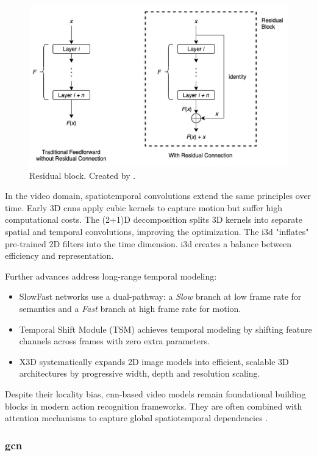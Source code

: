 \begin{figure}
    \centering
    \includegraphics[width=0.5\linewidth]{figures/res_connection.png} 
    \caption{Residual block. Created by \textcite{wong_what_is_residual_2022}.}
    \label{fig:res_connection}
\end{figure}

In the video domain, spatiotemporal convolutions extend the same principles over time. Early 3D \acrshort{cnn}s \cite{tran_learning_2015} apply cubic kernels to capture motion but suffer high computational costs. The (2+1)D decomposition \cite{tran_2_plus_1_convolution} splits 3D kernels into separate spatial and temporal convolutions, improving the optimization. The \acrfull{i3d} \cite{carreira_2017_i3d_quo_vadis} "inflates" pre-trained 2D filters into the time dimension. \acrshort{i3d} creates a balance between efficiency and representation.

Further advances address long-range temporal modeling:
\begin{itemize}
    \item SlowFast networks \cite{feichtenhofer_slowfast_2019} use a dual-pathway: a \emph{Slow} branch at low frame rate for semantics and a \emph{Fast} branch at high frame rate for motion.  
    \item Temporal Shift Module (TSM) \cite{lin_temporal_shift_2019} achieves temporal modeling by shifting feature channels across frames with zero extra parameters.  
    \item X3D \cite{feichtenhofer_x3d_2020} systematically expands 2D image models into efficient, scalable 3D architectures by progressive width, depth and resolution scaling.
\end{itemize}

Despite their locality bias, \acrshort{cnn}-based video models remain foundational building blocks in modern action recognition frameworks. They are often combined with attention mechanisms to capture global spatiotemporal dependencies \cite{fu_look_2017}.


\subsubsection{\acrfull{gcn}}

